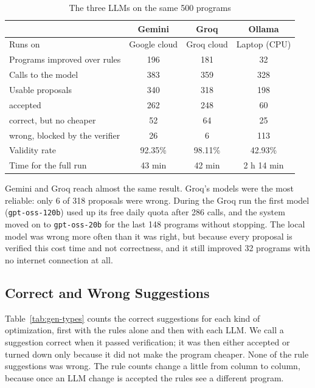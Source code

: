 \documentclass[12pt,a4paper]{report}
\begin{document}
\begin{table}[H]
\centering
\caption{The three LLMs on the same 500 programs}
\label{tab:llms}
\small
\begin{tabular}{|l|c|c|c|}
\hline
 & \textbf{Gemini} & \textbf{Groq} & \textbf{Ollama} \\
\hline
Runs on & Google cloud & Groq cloud & Laptop (CPU) \\
\hline
Programs improved over rules & 196 & 181 & 32 \\
\hline
Calls to the model & 383 & 359 & 328 \\
\hline
Usable proposals & 340 & 318 & 198 \\
\hline
\quad accepted & 262 & 248 & 60 \\
\hline
\quad correct, but no cheaper & 52 & 64 & 25 \\
\hline
\quad wrong, blocked by the verifier & 26 & 6 & 113 \\
\hline
Validity rate & 92.35\% & 98.11\% & 42.93\% \\
\hline
Time for the full run & 43 min & 42 min & 2 h 14 min \\
\hline
\end{tabular}
\end{table}

Gemini and Groq reach almost the same result. Groq's models were the most reliable: only 6 of 318 proposals were wrong. During the Groq run the first model (\texttt{gpt-oss-120b}) used up its free daily quota after 286 calls, and the system moved on to \texttt{gpt-oss-20b} for the last 148 programs without stopping. The local model was wrong more often than it was right, but because every proposal is verified this cost time and not correctness, and it still improved 32 programs with no internet connection at all.

\subsection{Correct and Wrong Suggestions}

Table~\ref{tab:gen-types} counts the correct suggestions for each kind of optimization, first with the rules alone and then with each LLM. We call a suggestion correct when it passed verification; it was then either accepted or turned down only because it did not make the program cheaper. None of the rule suggestions was wrong. The rule counts change a little from column to column, because once an LLM change is accepted the rules see a different program.
\end{document}
